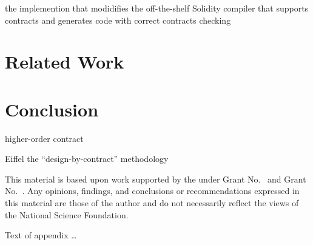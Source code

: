 \documentclass[acmsmall,review,anonymous]{acmart}\settopmatter{printfolios=true,printccs=false,printacmref=false}
\begin{document}
the implemention that modidifies the off-the-shelf Solidity compiler that
supports contracts and generates code with correct contracts checking


\section{Related Work}

\section{Conclusion}

higher-order contract \cite{DBLP:conf/icfp/FindlerF02}

Eiffel the ``design-by-contract'' methodology \cite{DBLP:books/ph/Meyer91, DBLP:conf/tools/Meyer98a}

\begin{acks}                            %
  This material is based upon work supported by the
   under Grant
  No.~ and Grant
  No.~.  Any opinions, findings, and
  conclusions or recommendations expressed in this material are those
  of the author and do not necessarily reflect the views of the
  National Science Foundation.
\end{acks}






Text of appendix \ldots
\end{document}
